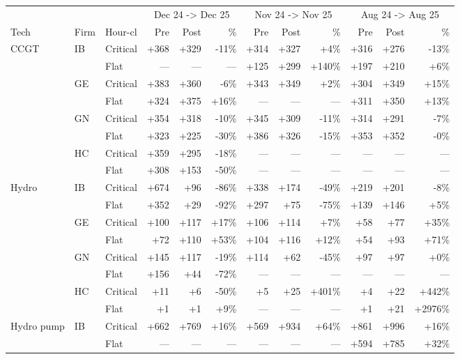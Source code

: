 \begin{tabular}{l l l r r r r r r r r r }
\toprule
 & & & \multicolumn{3}{c}{Dec 24 -> Dec 25} & \multicolumn{3}{c}{Nov 24 -> Nov 25} & \multicolumn{3}{c}{Aug 24 -> Aug 25} \\
\cmidrule(lr){4-6}\cmidrule(lr){7-9}\cmidrule(lr){10-12}
Tech & Firm & Hour-cl & Pre & Post & \% & Pre & Post & \% & Pre & Post & \% \\
\midrule
CCGT & IB & Critical & +368 & +329 & -11\% & +314 & +327 & +4\% & +316 & +276 & -13\% \\
 &  & Flat & --- & --- & --- & +125 & +299 & +140\% & +197 & +210 & +6\% \\
 & GE & Critical & +383 & +360 & -6\% & +343 & +349 & +2\% & +304 & +349 & +15\% \\
 &  & Flat & +324 & +375 & +16\% & --- & --- & --- & +311 & +350 & +13\% \\
 & GN & Critical & +354 & +318 & -10\% & +345 & +309 & -11\% & +314 & +291 & -7\% \\
 &  & Flat & +323 & +225 & -30\% & +386 & +326 & -15\% & +353 & +352 & -0\% \\
 & HC & Critical & +359 & +295 & -18\% & --- & --- & --- & --- & --- & --- \\
 &  & Flat & +308 & +153 & -50\% & --- & --- & --- & --- & --- & --- \\
\addlinespace
Hydro & IB & Critical & +674 & +96 & -86\% & +338 & +174 & -49\% & +219 & +201 & -8\% \\
 &  & Flat & +352 & +29 & -92\% & +297 & +75 & -75\% & +139 & +146 & +5\% \\
 & GE & Critical & +100 & +117 & +17\% & +106 & +114 & +7\% & +58 & +77 & +35\% \\
 &  & Flat & +72 & +110 & +53\% & +104 & +116 & +12\% & +54 & +93 & +71\% \\
 & GN & Critical & +145 & +117 & -19\% & +114 & +62 & -45\% & +97 & +97 & +0\% \\
 &  & Flat & +156 & +44 & -72\% & --- & --- & --- & --- & --- & --- \\
 & HC & Critical & +11 & +6 & -50\% & +5 & +25 & +401\% & +4 & +22 & +442\% \\
 &  & Flat & +1 & +1 & +9\% & --- & --- & --- & +1 & +21 & +2976\% \\
\addlinespace
Hydro pump & IB & Critical & +662 & +769 & +16\% & +569 & +934 & +64\% & +861 & +996 & +16\% \\
 &  & Flat & --- & --- & --- & --- & --- & --- & +594 & +785 & +32\% \\

\end{tabular}
